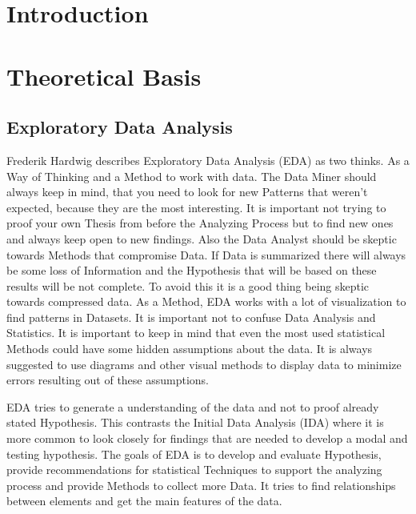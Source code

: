 \documentclass[a4paper, 12pt, oneside]{scrbook}
\begin{document}
	\frontmatter
	
	
	\tableofcontents
	\listoffigures
	\nocite{*}

	\mainmatter

	\pagebreak
	\chapter{Introduction} 
	
	\chapter{Theoretical Basis}
	
		\section{Exploratory Data Analysis} \label{EDA}
			
			\noindent Frederik Hardwig describes Exploratory Data Analysis (\ac{EDA}) as two thinks. As a Way of Thinking and a Method to work with data. 
			The Data Miner should always keep in mind, that you need to look for new Patterns that weren't expected, because they are the most interesting. It is important not trying to proof your own Thesis from before the Analyzing Process but to find new ones and always keep open to new findings. Also the Data Analyst should be skeptic towards Methods that compromise Data. If Data is summarized there will always be some loss of Information and the Hypothesis that will be based on these results will be not complete. To avoid this it is a good thing being skeptic towards compressed data. 
			As a Method, \ac{EDA} works with a lot of visualization to find patterns in Datasets. It is important not to confuse Data Analysis and Statistics. It is important to keep in mind that even the most used statistical Methods could have some hidden assumptions about the data. It is always suggested to use diagrams and other visual methods to display data to minimize errors resulting out of these assumptions.\cite{Hardwig:Explortory_Data_Analysis}
			
			\noindent \ac{EDA} tries to generate a understanding of the data and not to proof already stated Hypothesis. This contrasts the Initial Data Analysis (\ac{IDA}) where it is more common to look closely for findings that are needed to develop a modal and testing hypothesis. The goals of \ac{EDA} is to develop and evaluate Hypothesis, provide recommendations for statistical Techniques to support the analyzing process and provide Methods to collect more Data. It tries to find relationships between elements and get the main features of the data. 
			
\end{document}

